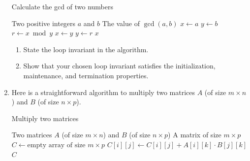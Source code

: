 \begin{exercises}
\begin{enumerate}
        \begin{algorithm}[H]
            \caption{Calculate the gcd of two numbers}
            \begin{algorithmic}[1]
                \Require Two positive integers $a$ and $b$
                \Ensure The value of $\gcd\left(a, b\right)$
                    \State $x \gets a$
                    \State $y \gets b$
                        \State $r \gets x \bmod y$
                        \State $x \gets y$
                        \State $y \gets r$
                    \EndWhile
                    \Return $x$
                \EndFunction
            \end{algorithmic}
        \end{algorithm}

        \begin{enumerate}
            \item State the loop invariant in the algorithm.
            \item Show that your chosen loop invariant satisfies the initialization, maintenance, and termination properties.
        \end{enumerate}

    \item[\challenge] Here is a straightforward algorithm to multiply two matrices $A$ (of size $m \times n$) and $B$ (of size $n \times p$).
        \begin{algorithm}[H]
            \caption{Multiply two matrices}
            \begin{algorithmic}[1]
                \Require Two matrices $A$ (of size $m \times n$) and $B$ (of size $n \times p$)
                \Ensure A matrix of size $m \times p$
                    \State $C \gets \text{empty array of size $m \times p$}$
                                \State $C[i][j] \gets C[i][j] + A[i][k]\cdot B[j][k]$
                            \EndFor
                        \EndFor
                    \EndFor
                    \Return $C$
                \EndFunction
            \end{algorithmic}
        \end{algorithm}


\end{enumerate}
\end{exercises}
